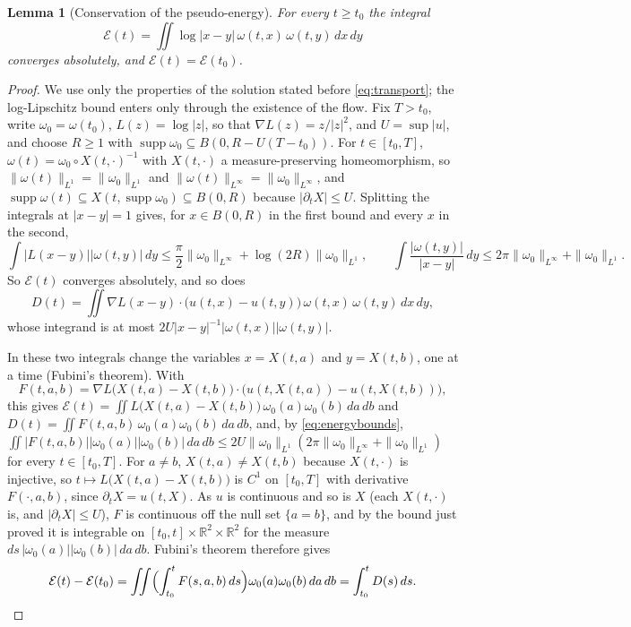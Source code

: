 \documentclass[11pt]{article}
\newtheorem{lemma}{Lemma}
\theoremstyle{definition}
\newcommand{\R}{\mathbb{R}}
\begin{document}
\begin{lemma}[Conservation of the pseudo-energy]\label{lem:energy}
For every $t \ge t_0$ the integral
\[
  \mathcal E(t) = \iint\log|x - y|\,\omega(t, x)\,\omega(t, y)\,dx\,dy
\]
converges absolutely, and $\mathcal E(t) = \mathcal E(t_0)$.
\end{lemma}

\begin{proof}
We use only the properties of the solution stated before \eqref{eq:transport}; the log-Lipschitz bound enters only through the existence of the flow. Fix $T > t_0$, write $\omega_0 = \omega(t_0)$, $L(z) = \log|z|$, so that $\nabla L(z) = z/|z|^2$, and $U = \sup|u|$, and choose $R \ge 1$ with $\operatorname{supp}\omega_0 \subseteq B(0, R - U(T - t_0))$. For $t \in [t_0, T]$, $\omega(t) = \omega_0\circ X(t, \cdot)^{-1}$ with $X(t, \cdot)$ a measure-preserving homeomorphism, so $\|\omega(t)\|_{L^1} = \|\omega_0\|_{L^1}$ and $\|\omega(t)\|_{L^\infty} = \|\omega_0\|_{L^\infty}$, and $\operatorname{supp}\omega(t) \subseteq X(t, \operatorname{supp}\omega_0) \subseteq B(0, R)$ because $|\partial_tX| \le U$. Splitting the integrals at $|x - y| = 1$ gives, for $x \in B(0, R)$ in the first bound and every $x$ in the second,
\begin{equation}\label{eq:energybounds}
  \int\bigl|L(x - y)\bigr||\omega(t, y)|\,dy \le \frac\pi2\|\omega_0\|_{L^\infty} + \log(2R)\|\omega_0\|_{L^1},\qquad
  \int\frac{|\omega(t, y)|}{|x - y|}\,dy \le 2\pi\|\omega_0\|_{L^\infty} + \|\omega_0\|_{L^1}.
\end{equation}
So $\mathcal E(t)$ converges absolutely, and so does
\[
  D(t) = \iint\nabla L(x - y)\cdot\bigl(u(t, x) - u(t, y)\bigr)\,\omega(t, x)\,\omega(t, y)\,dx\,dy,
\]
whose integrand is at most $2U|x - y|^{-1}|\omega(t, x)||\omega(t, y)|$.

In these two integrals change the variables $x = X(t, a)$ and $y = X(t, b)$, one at a time (Fubini's theorem). With
\[
  F(t, a, b) = \nabla L\bigl(X(t, a) - X(t, b)\bigr)\cdot\bigl(u(t, X(t, a)) - u(t, X(t, b))\bigr),
\]
this gives $\mathcal E(t) = \iint L\bigl(X(t, a) - X(t, b)\bigr)\,\omega_0(a)\omega_0(b)\,da\,db$ and $D(t) = \iint F(t, a, b)\,\omega_0(a)\omega_0(b)\,da\,db$, and, by \eqref{eq:energybounds}, $\iint|F(t, a, b)||\omega_0(a)||\omega_0(b)|\,da\,db \le 2U\|\omega_0\|_{L^1}(2\pi\|\omega_0\|_{L^\infty} + \|\omega_0\|_{L^1})$ for every $t \in [t_0, T]$. For $a \ne b$, $X(t, a) \ne X(t, b)$ because $X(t, \cdot)$ is injective, so $t \mapsto L\bigl(X(t, a) - X(t, b)\bigr)$ is $C^1$ on $[t_0, T]$ with derivative $F(\cdot, a, b)$, since $\partial_tX = u(t, X)$. As $u$ is continuous and so is $X$ (each $X(t, \cdot)$ is, and $|\partial_tX| \le U$), $F$ is continuous off the null set $\{a = b\}$, and by the bound just proved it is integrable on $[t_0, t]\times\R^2\times\R^2$ for the measure $ds\,|\omega_0(a)||\omega_0(b)|\,da\,db$. Fubini's theorem therefore gives
\[
  \mathcal E(t) - \mathcal E(t_0) = \iint\Bigl(\int_{t_0}^tF(s, a, b)\,ds\Bigr)\omega_0(a)\omega_0(b)\,da\,db = \int_{t_0}^tD(s)\,ds.
\]


\end{proof}
\end{document}
